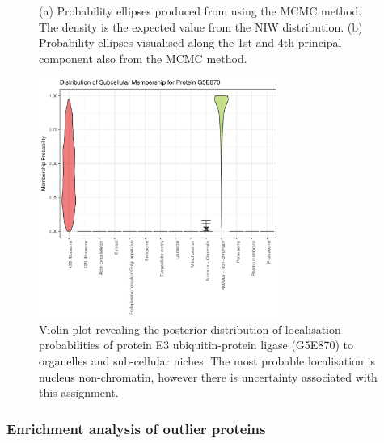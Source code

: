 \documentclass[12pt,english]{article}\usepackage[]{graphicx}\usepackage[]{color}
\newenvironment{knitrout}{}{} %
\begin{document}
\begin{figure}[ht]
\begin{subfigure}[t]{0.45\textwidth}
\begin{knitrout}
\end{knitrout}
        \centering
        \caption{}
\end{subfigure}
  \centering
  \caption{(a) Probability ellipses produced from using the MCMC
    method.  The density is the expected value from the NIW
    distribution. (b) Probability ellipses visualised along the 1st
    and 4th principal component also from the MCMC method.}
\label{figure::pcaellipseMCMC}
\end{figure}

\begin{figure}[ht]
\centering
\begin{knitrout}
\color{fgcolor}

{\centering \includegraphics[width=0.7\textwidth]{figure/unnamed-chunk-6-1} 

}



\end{knitrout}

\caption{Violin plot revealing the posterior distribution of
  localisation probabilities of protein E3 ubiquitin-protein ligase
  (G5E870) to organelles and sub-cellular niches.  The most probable
  localisation is nucleus non-chromatin, however there is uncertainty
  associated with this assignment.}
\label{fig:G5E870}
\end{figure}

\clearpage

\subsubsection{Enrichment analysis of outlier proteins}
\end{document}
